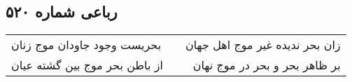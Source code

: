 \begin{center}
\section*{رباعی شماره ۵۲۰}
\label{sec:sh520}
\begin{longtable}{l p{0.5cm} r}
بحریست وجود جاودان موج زنان
&&
زان بحر ندیده غیر موج اهل جهان
\\
از باطن بحر موج بین گشته عیان
&&
بر ظاهر بحر و بحر در موج نهان
\\
\end{longtable}
\end{center}
